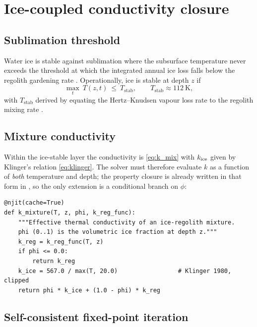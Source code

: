\section{Ice-coupled conductivity closure}

\subsection{Sublimation threshold}

Water ice is stable against sublimation where the subsurface
temperature never exceeds the threshold at which the integrated
annual ice loss falls below the regolith gardening rate
\citep{schorghofer2007}.  Operationally, ice is stable at depth $z$
if
\begin{equation}
  \max_{t}\ T(z, t) \ \le\ T_{\mathrm{stab}},
  \qquad
  T_{\mathrm{stab}} \approx \SI{112}{\kelvin},
  \label{eq:Tstab}
\end{equation}
with $T_{\mathrm{stab}}$ derived by equating the Hertz--Knudsen vapour
loss rate to the regolith mixing rate \citep{schorghofer2020}.

\subsection{Mixture conductivity}

Within the ice-stable layer the conductivity is
\cref{eq:k_mix} with $k_{\mathrm{ice}}$ given by Klinger's relation
\cref{eq:klinger}.  The solver must therefore evaluate $k$ as a
function of \emph{both} temperature and depth; the property closure is
already written in that form in , so the
only extension is a conditional branch on $\phi$:

\begin{lstlisting}[caption={Ice-coupled conductivity closure (Phase-3 extension).},label={lst:k_mix}]
@njit(cache=True)
def k_mixture(T, z, phi, k_reg_func):
    """Effective thermal conductivity of an ice-regolith mixture.
    phi (0..1) is the volumetric ice fraction at depth z."""
    k_reg = k_reg_func(T, z)
    if phi <= 0.0:
        return k_reg
    k_ice = 567.0 / max(T, 20.0)                 # Klinger 1980, clipped
    return phi * k_ice + (1.0 - phi) * k_reg
\end{lstlisting}

\subsection{Self-consistent fixed-point iteration}

